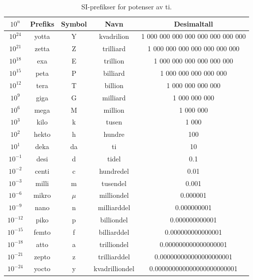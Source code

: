\begin{table}[h!]
\centering
\renewcommand{\arraystretch}{1.2}
\begin{tabular}{|c|c|c|c|c|}
\hline
\rowcolor{blue!20!black!10}
$10^n$ & Prefiks & Symbol & Navn & Desimaltall \\
\hline
$10^{24}$ & yotta & Y & kvadrilion & 1 000 000 000 000 000 000 000 000 \\
$10^{21}$ & zetta & Z & trilliard  & 1 000 000 000 000 000 000 000 \\
$10^{18}$ & exa   & E & trillion   & 1 000 000 000 000 000 000 \\
$10^{15}$ & peta  & P & billiard   & 1 000 000 000 000 000 \\
$10^{12}$ & tera  & T & billion    & 1 000 000 000 000 \\
$10^{9}$  & giga  & G & milliard   & 1 000 000 000 \\
$10^{6}$  & mega  & M & million    & 1 000 000 \\
$10^{3}$  & kilo  & k & tusen      & 1 000 \\
$10^{2}$  & hekto & h & hundre     & 100 \\
$10^{1}$  & deka  & da& ti         & 10 \\
$10^{-1}$ & desi  & d & tidel      & 0.1 \\
$10^{-2}$ & centi & c & hundredel  & 0.01 \\
$10^{-3}$ & milli & m & tusendel   & 0.001 \\
$10^{-6}$ & mikro & $\mu$ & milliondel & 0.000001 \\
$10^{-9}$ & nano  & n & milliarddel  & 0.000000001 \\
$10^{-12}$& piko  & p & billiondel   & 0.000000000001 \\
$10^{-15}$& femto & f & billiarddel  & 0.000000000000001 \\
$10^{-18}$& atto  & a & trilliondel  & 0.000000000000000001 \\
$10^{-21}$& zepto & z & trilliarddel & 0.000000000000000000001 \\
$10^{-24}$& yocto & y & kvadrilliondel & 0.000000000000000000000001 \\
\hline
\end{tabular}
\caption{SI-prefikser for potenser av ti.}
\label{tab:dekPref}
\end{table}

